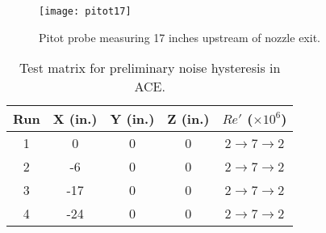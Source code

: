\begin{figure}[ht!]
    \centering
    \texttt{[image: pitot17]}
    \caption{Pitot probe measuring 17 inches upstream of nozzle exit.}
    \label{fig:pitot17}
\end{figure}

\begin{table}[ht!]
    \centering
    \begin{tabular}{|c|c|c|c|c|}
        \hline
    \textbf{Run} & \textbf{X (in.)} & \textbf{Y (in.)} & \textbf{Z (in.)} & \textbf{$Re'$ ($\times10^6$)} \\ \hline
        1 & 0 & 0 & 0 & 2$\to$7$\to$2 \\ \hline
        2 & -6 & 0 & 0 & 2$\to$7$\to$2 \\ \hline
        3 & -17 & 0 & 0 & 2$\to$7$\to$2 \\ \hline
        4 & -24 & 0 & 0 & 2$\to$7$\to$2 \\ \hline
    \end{tabular}
    \caption{Test matrix for preliminary noise hysteresis in ACE.}
    \label{tab:ace-survey}
\end{table}

